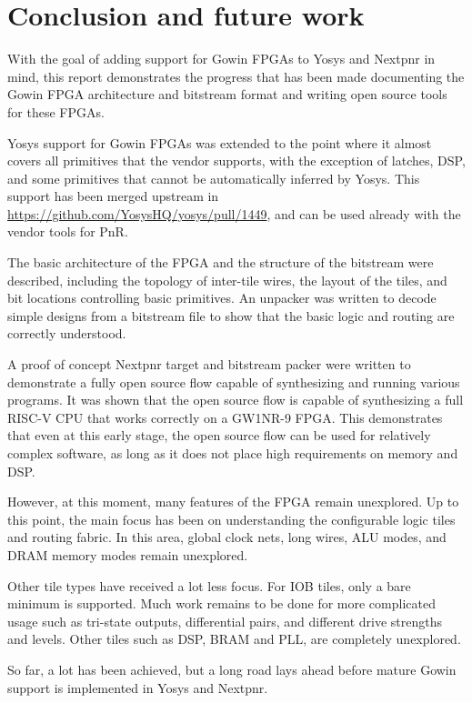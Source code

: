 \documentclass{article}
\begin{document}
\section{Conclusion and future work}

With the goal of adding support for Gowin FPGAs to Yosys and Nextpnr in mind, this report demonstrates the progress that has been made documenting the Gowin FPGA architecture and bitstream format and writing open source tools for these FPGAs.

Yosys support for Gowin FPGAs was extended to the point where it almost covers all primitives that the vendor supports, with the exception of latches, DSP, and some primitives that cannot be automatically inferred by Yosys. This support has been merged upstream in \url{https://github.com/YosysHQ/yosys/pull/1449}, and can be used already with the vendor tools for PnR.

The basic architecture of the FPGA and the structure of the bitstream were described, including the topology of inter-tile wires, the layout of the tiles, and bit locations controlling basic primitives. An unpacker was written to decode simple designs from a bitstream file to show that the basic logic and routing are correctly understood.

A proof of concept Nextpnr target and bitstream packer were written to demonstrate a fully open source flow capable of synthesizing and running various programs. It was shown that the open source flow is capable of synthesizing a full RISC-V CPU that works correctly on a GW1NR-9 FPGA. This demonstrates that even at this early stage, the open source flow can be used for relatively complex software, as long as it does not place high requirements on memory and DSP.

However, at this moment, many features of the FPGA remain unexplored. Up to this point, the main focus has been on understanding the configurable logic tiles and routing fabric. In this area, global clock nets, long wires, ALU modes, and DRAM memory modes remain unexplored.

Other tile types have received a lot less focus. For IOB tiles, only a bare minimum is supported. Much work remains to be done for more complicated usage such as tri-state outputs, differential pairs, and different drive strengths and levels. Other tiles such as DSP, BRAM and PLL, are completely unexplored.

So far, a lot has been achieved, but a long road lays ahead before mature Gowin support is implemented in Yosys and Nextpnr.

\printbibliography
\end{document}
